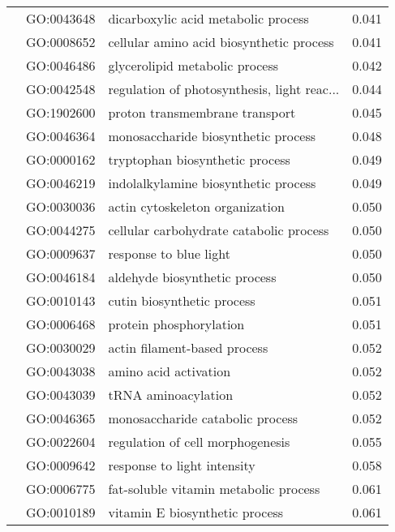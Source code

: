 \begin{longtable}{lllr}
   & GO:0043648 &          dicarboxylic acid metabolic process &         0.041 \\
   & GO:0008652 &     cellular amino acid biosynthetic process &         0.041 \\
   & GO:0046486 &               glycerolipid metabolic process &         0.042 \\
   & GO:0042548 &  regulation of photosynthesis, light reac... &         0.044 \\
   & GO:1902600 &               proton transmembrane transport &         0.045 \\
   & GO:0046364 &          monosaccharide biosynthetic process &         0.048 \\
   & GO:0000162 &              tryptophan biosynthetic process &         0.049 \\
   & GO:0046219 &         indolalkylamine biosynthetic process &         0.049 \\
   & GO:0030036 &              actin cytoskeleton organization &         0.050 \\
   & GO:0044275 &      cellular carbohydrate catabolic process &         0.050 \\
   & GO:0009637 &                       response to blue light &         0.050 \\
   & GO:0046184 &                aldehyde biosynthetic process &         0.050 \\
   & GO:0010143 &                   cutin biosynthetic process &         0.051 \\
   & GO:0006468 &                      protein phosphorylation &         0.051 \\
   & GO:0030029 &                 actin filament-based process &         0.052 \\
   & GO:0043038 &                        amino acid activation &         0.052 \\
   & GO:0043039 &                          tRNA aminoacylation &         0.052 \\
   & GO:0046365 &             monosaccharide catabolic process &         0.052 \\
   & GO:0022604 &             regulation of cell morphogenesis &         0.055 \\
   & GO:0009642 &                  response to light intensity &         0.058 \\
   & GO:0006775 &        fat-soluble vitamin metabolic process &         0.061 \\
   & GO:0010189 &               vitamin E biosynthetic process &         0.061 \\

\end{longtable}
